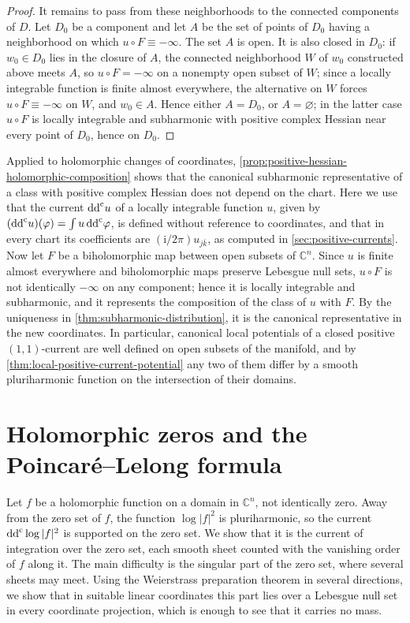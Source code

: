 \begin{proof}
It remains to pass from these neighborhoods to the connected components of $D$. Let $D_0$ be a component and let $A$ be the set of points of $D_0$ having a neighborhood on which $u\circ F\equiv-\infty$. The set $A$ is open. It is also closed in $D_0$: if $w_0\in D_0$ lies in the closure of $A$, the connected neighborhood $W$ of $w_0$ constructed above meets $A$, so $u\circ F=-\infty$ on a nonempty open subset of $W$; since a locally integrable function is finite almost everywhere, the alternative on $W$ forces $u\circ F\equiv-\infty$ on $W$, and $w_0\in A$. Hence either $A=D_0$, or $A=\varnothing$; in the latter case $u\circ F$ is locally integrable and subharmonic with positive complex Hessian near every point of $D_0$, hence on $D_0$.
\end{proof}

Applied to holomorphic changes of coordinates, \cref{prop:positive-hessian-holomorphic-composition} shows that the canonical subharmonic representative of a class with positive complex Hessian does not depend on the chart. Here we use that the current $\mathrm{dd}^{\mathrm{c}} u$ of a locally integrable function $u$, given by $(\mathrm{dd}^{\mathrm{c}} u)(\varphi)=\int u\,\mathrm{dd}^{\mathrm{c}}\varphi$, is defined without reference to coordinates, and that in every chart its coefficients are $(\mathrm i/2\pi)u_{j\bar k}$, as computed in \cref{sec:positive-currents}. Now let $F$ be a biholomorphic map between open subsets of $\mathbb C^n$. Since $u$ is finite almost everywhere and biholomorphic maps preserve Lebesgue null sets, $u\circ F$ is not identically $-\infty$ on any component; hence it is locally integrable and subharmonic, and it represents the composition of the class of $u$ with $F$. By the uniqueness in \cref{thm:subharmonic-distribution}, it is the canonical representative in the new coordinates. In particular, canonical local potentials of a closed positive $(1,1)$-current are well defined on open subsets of the manifold, and by \cref{thm:local-positive-current-potential} any two of them differ by a smooth pluriharmonic function on the intersection of their domains.

\section{Holomorphic zeros and the Poincar\'e--Lelong formula}
\label{sec:poincare-lelong}

Let $f$ be a holomorphic function on a domain in $\mathbb C^n$, not identically zero. Away from the zero set of $f$, the function $\log|f|^2$ is pluriharmonic, so the current $\mathrm{dd}^{\mathrm{c}}\log|f|^2$ is supported on the zero set. We show that it is the current of integration over the zero set, each smooth sheet counted with the vanishing order of $f$ along it. The main difficulty is the singular part of the zero set, where several sheets may meet. Using the Weierstrass preparation theorem in several directions, we show that in suitable linear coordinates this part lies over a Lebesgue null set in every coordinate projection, which is enough to see that it carries no mass.


